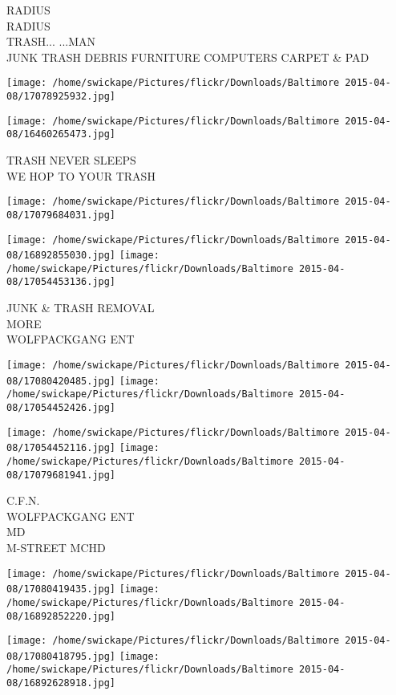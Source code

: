 \documentclass[10pt,letterpaper]{article}
\begin{document}
RADIUS\\
RADIUS\\
TRASH... ...MAN\\
JUNK TRASH DEBRIS FURNITURE COMPUTERS CARPET \& PAD
\pagebreak

\texttt{[image: /home/swickape/Pictures/flickr/Downloads/Baltimore 2015-04-08/17078925932.jpg]}

\vspace{0.25in}
\texttt{[image: /home/swickape/Pictures/flickr/Downloads/Baltimore 2015-04-08/16460265473.jpg]}

TRASH NEVER SLEEPS\\
WE HOP TO YOUR TRASH
\pagebreak

\texttt{[image: /home/swickape/Pictures/flickr/Downloads/Baltimore 2015-04-08/17079684031.jpg]}

\vspace{0.25in}
\texttt{[image: /home/swickape/Pictures/flickr/Downloads/Baltimore 2015-04-08/16892855030.jpg]}
\texttt{[image: /home/swickape/Pictures/flickr/Downloads/Baltimore 2015-04-08/17054453136.jpg]}

JUNK \& TRASH REMOVAL\\
MORE\\
WOLFPACKGANG ENT
\pagebreak

\texttt{[image: /home/swickape/Pictures/flickr/Downloads/Baltimore 2015-04-08/17080420485.jpg]}
\texttt{[image: /home/swickape/Pictures/flickr/Downloads/Baltimore 2015-04-08/17054452426.jpg]}

\texttt{[image: /home/swickape/Pictures/flickr/Downloads/Baltimore 2015-04-08/17054452116.jpg]}
\texttt{[image: /home/swickape/Pictures/flickr/Downloads/Baltimore 2015-04-08/17079681941.jpg]}

C.F.N.\\
WOLFPACKGANG ENT\\
MD\\
M{-}STREET MCHD
\pagebreak

\texttt{[image: /home/swickape/Pictures/flickr/Downloads/Baltimore 2015-04-08/17080419435.jpg]}
\texttt{[image: /home/swickape/Pictures/flickr/Downloads/Baltimore 2015-04-08/16892852220.jpg]}

\texttt{[image: /home/swickape/Pictures/flickr/Downloads/Baltimore 2015-04-08/17080418795.jpg]}
\texttt{[image: /home/swickape/Pictures/flickr/Downloads/Baltimore 2015-04-08/16892628918.jpg]}
\end{document}
